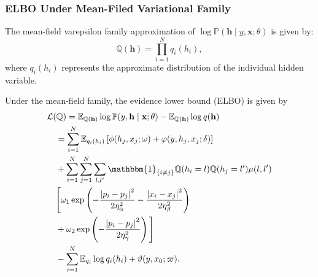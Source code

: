 \documentclass[conference]{IEEEtran}
\newcommand{\EE}{{\mathbb{E}}}
\newcommand{\hb}{\mathbf{h}}
\newcommand{\Lc}{\mathcal{L}}
\newcommand{\PP}{{\mathbb{P}}}
\newcommand{\QQ}{{\mathbb{Q}}}
\newcommand{\xb}{\mathbf{x}}
\newcommand{\one}{\mathbbm{1}}
\let\oldsubsubsection\subsubsection
\renewcommand{\subsubsection}[1]{\oldsubsubsection{\textbf{#1}}}
\begin{document}
\subsubsection{ELBO Under Mean-Filed Variational Family}


The mean-field varepsilon family approximation of
$\log \PP(\hb \mid y, \xb; \theta)$ is given by:
\begin{equation*}
\QQ(\hb) = \prod_{i=1}^N q_i(h_i),
\end{equation*}
where $q_i(h_i)$ represents the approximate distribution of the individual
hidden variable.


Under the mean-field family, the evidence lower bound (ELBO) is given by
\begin{equation}
\begin{split}
& \Lc(\QQ) = \EE_{\QQ(\hb)} \log\PP(y, \hb \mid \xb; \theta)
- \EE_{\QQ(\hb)} \log q(\hb) \\
&\quad = \sum_{i=1}^N \EE_{q_i(h_i)}
\left[ \phi(h_j, x_j; \omega) + \varphi(y, h_j, x_j; \delta) \right] \\
&\quad + \sum_{i=1}^N \sum_{j=1}^N \sum_{l,l^\prime} \one_{\{i \neq j\}} 
\QQ(h_i = l) \QQ(h_j = l^\prime) \mu(l, l^\prime) \\
&\quad \Bigg[ \omega_1 \exp \left(
- \frac{\left\lvert p_i - p_j \right\rvert^2}{2\eta_\alpha^2}
- \frac{\left\lvert x_i - x_j \right\rvert^2}{2\eta_\beta^2} \right) \\
&\quad + \omega_2 \exp \left(
- \frac{\left\lvert p_i - p_j \right\rvert^2}{2\eta_\gamma^2}
\right) \Bigg] \\
&\quad - \sum_{i=1}^N \EE_{q_i} \log q_i(h_i) + \vartheta(y, x_0; \varpi).
\end{split}
\end{equation}
\end{document}
